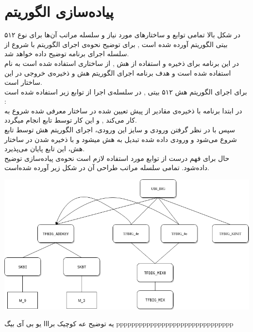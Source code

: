 \section{پیاده‌سازی الگوریتم}
در شکل بالا تمامی توابع و ساختارهای مورد نیاز  و سلسله مراتب آن‌ها برای نوع ۵۱۲ بیتی الگوریتم آورده شده است , برای توضیح نحوه‌ی اجرای الگوریتم با شروع از  
 سلسله اجرای برنامه توضیح داده خواهد شد.
\\
در این برنامه برای ‌ذخیره و استفاده از هش , از ساختاری استفاده شده است به نام \hyperref[subsec:sph-skein-big-context]{} استفاده شده است و هدف برنامه اجرای الگوریتم هش و ذخیره‌ی خروجی در این ساختار است.
\\
برای اجرای الگوریتم هش ۵۱۲ بیتی , در سلسله‌ی اجرا از توابع زیر استفاده شده است :
\\
در ابتدا برنامه با ذخیره‌ی مقادیر از پیش تعیین شده  \hyperref[subsec:IV512]{} در ساختار معرفی شده شروع به کار می‌کند , و این کار توسط تابع
\hyperref[subsec:sph-skein512-init]{}
   انجام میگردد.
  \\ سپس با در نظر گرفتن ورودی و سایز این ورودی، اجرای الگوریتم هش  توسط تابع \hyperref[subsec:sph-skein512]{}
   شروع می‌شود و ورودی داده شده تبدیل به هش میشود و با ذخیره شدن در ساختار  هش، این تابع پایان می‌پذیرد.
  \\ 
  حال برای فهم درست از توابع مورد استفاده لازم است نحوه‌ی پیاده‌سازی \hyperref[subsec:UBI-BIG]{} توضیح داده‌شود. تمامی سلسله مراتب طراحی آن در شکل زیر آورده شده‌است.
  \begin{center}
  		\includegraphics[width=16cm]{images/UBI.png}	
  \end{center}
  
یه توضیح عه کوچیک برااا یو بی آی بیگ   ppppppppppppppppppppppppppppppp

